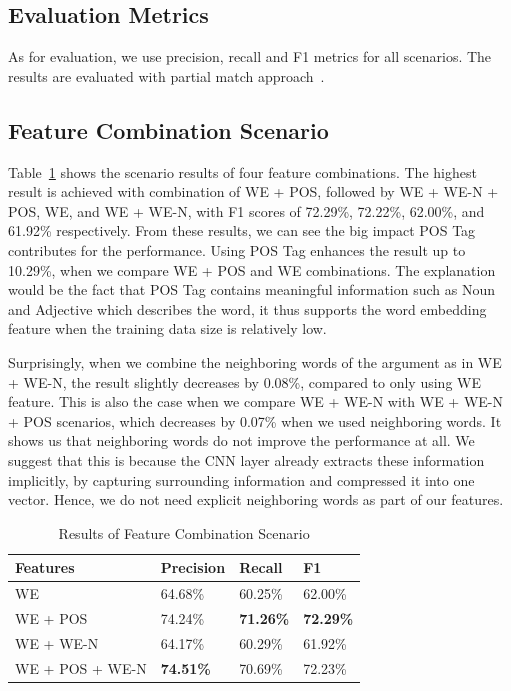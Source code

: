\subsection{Evaluation Metrics}
As for evaluation, we use precision, recall and F1 metrics for all scenarios. The results are evaluated with partial match approach~\cite{seki2003probabilistic}.

\subsection{Feature Combination Scenario}
Table~\ref{tab:feature_scenario} shows the scenario results of four feature combinations. The highest result is achieved with combination of WE + POS, followed by WE + WE-N + POS, WE, and WE + WE-N, with F1 scores of 72.29\%, 72.22\%, 62.00\%, and 61.92\% respectively. From these results, we can see the big impact POS Tag contributes for the performance. Using POS Tag enhances the result up to 10.29\%, when we compare WE + POS and WE combinations. The explanation would be the fact that POS Tag contains meaningful information such as Noun and Adjective which describes the word, it thus supports the word embedding feature when the training data size is relatively low.

Surprisingly, when we combine the neighboring words of the argument as in WE + WE-N, the result slightly decreases by 0.08\%, compared to only using WE feature. This is also the case when we compare WE + WE-N with WE + WE-N + POS scenarios, which decreases by 0.07\% when we used neighboring words. It shows us that neighboring words do not improve the performance at all. We suggest that this is because the CNN layer already extracts these information implicitly, by capturing surrounding information and compressed it into one vector. Hence, we do not need explicit neighboring words as part of our features. 

\begin{table}
	\caption{Results of Feature Combination Scenario}
	\label{tab:feature_scenario}
	\begin{tabular}{llll}
		\toprule
		Features		&Precision	&Recall		&F1			\\
		\midrule
		WE				&	64.68\%				&	60.25\%				&	62.00\%	\\
		WE + POS		&	74.24\%				&	\textbf{71.26\%}	&	\textbf{72.29\%}	\\
		WE + WE-N		&	64.17\%				&	60.29\%				&	61.92\%	\\
		WE + POS + WE-N	&	\textbf{74.51\%}	&	70.69\%				&	72.23\%	\\
		\bottomrule
	\end{tabular}
\end{table}

